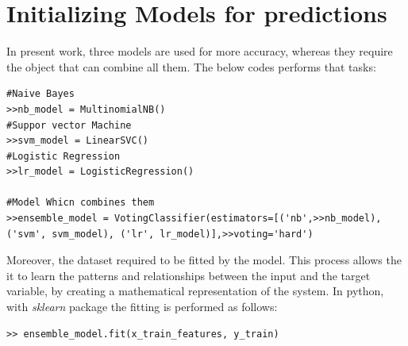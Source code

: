 \documentclass[12pt,a4paper]{article}
\begin{document}
\section{Initializing Models for predictions}
In present work, three models are used for more accuracy, whereas they require the object that can combine all them. The below codes performs that tasks:
\begin{verbatim}
#Naive Bayes
>>nb_model = MultinomialNB() 
#Suppor vector Machine
>>svm_model = LinearSVC()
#Logistic Regression
>>lr_model = LogisticRegression() 
	
#Model Whicn combines them
>>ensemble_model = VotingClassifier(estimators=[('nb',>>nb_model), 
('svm', svm_model), ('lr', lr_model)],>>voting='hard')
\end{verbatim}
Moreover, the dataset required to be fitted by the model. This process allows the it to learn the patterns and relationships between the input and the target variable, by creating a mathematical representation of the system. In python, with \textit{sklearn} package the fitting is performed as follows:
\begin{verbatim}
>> ensemble_model.fit(x_train_features, y_train)
\end{verbatim}
\end{document}
